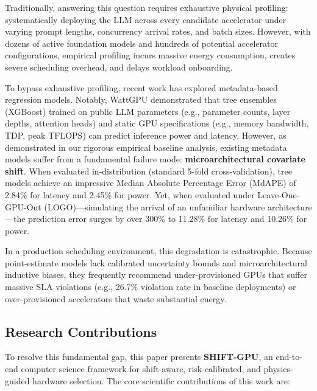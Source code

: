 \documentclass[3p,12pt]{elsarticle}
\begin{document}
Traditionally, answering this question requires exhaustive physical profiling: systematically deploying the LLM across every candidate accelerator under varying prompt lengths, concurrency arrival rates, and batch sizes. However, with dozens of active foundation models and hundreds of potential accelerator configurations, empirical profiling incurs massive energy consumption, creates severe scheduling overhead, and delays workload onboarding. 

To bypass exhaustive profiling, recent work has explored metadata-based regression models. Notably, WattGPU \citep{fadel2026wattgpu} demonstrated that tree ensembles (XGBoost) trained on public LLM parameters (e.g., parameter counts, layer depths, attention heads) and static GPU specifications (e.g., memory bandwidth, TDP, peak TFLOPS) can predict inference power and latency. However, as demonstrated in our rigorous empirical baseline analysis, existing metadata models suffer from a fundamental failure mode: \textbf{microarchitectural covariate shift}. When evaluated in-distribution (standard 5-fold cross-validation), tree models achieve an impressive Median Absolute Percentage Error (MdAPE) of 2.84\% for latency and 2.45\% for power. Yet, when evaluated under Leave-One-GPU-Out (LOGO)---simulating the arrival of an unfamiliar hardware architecture---the prediction error surges by over 300\% to 11.28\% for latency and 10.26\% for power. 

In a production scheduling environment, this degradation is catastrophic. Because point-estimate models lack calibrated uncertainty bounds and microarchitectural inductive biases, they frequently recommend under-provisioned GPUs that suffer massive SLA violations (e.g., 26.7\% violation rate in baseline deployments) or over-provisioned accelerators that waste substantial energy.

\subsection{Research Contributions}
To resolve this fundamental gap, this paper presents \textbf{SHIFT-GPU}, an end-to-end computer science framework for shift-aware, risk-calibrated, and physics-guided hardware selection. The core scientific contributions of this work are:
\end{document}

